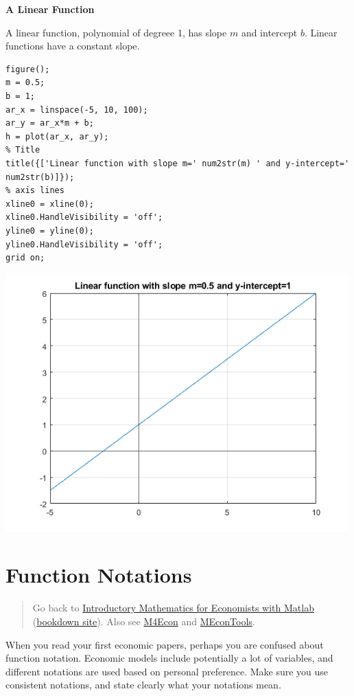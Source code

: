 \documentclass[
]{book}
\begin{document}
\textbf{A Linear Function}

A linear function, polynomial of degreee 1, has slope \(m\) and intercept
\(b\). Linear functions have a constant slope.

\begin{verbatim}
figure();
m = 0.5;
b = 1;
ar_x = linspace(-5, 10, 100);
ar_y = ar_x*m + b;
h = plot(ar_x, ar_y);
% Title
title({['Linear function with slope m=' num2str(m) ' and y-intercept=' num2str(b)]});
% axis lines
xline0 = xline(0);
xline0.HandleVisibility = 'off';
yline0 = yline(0);
yline0.HandleVisibility = 'off';
grid on;
\end{verbatim}

\includegraphics[width=5.20833in,height=\textheight]{img/whatisfunction_images/figure_2.png}

\hypertarget{function-notations}{%
\section{Function Notations}\label{function-notations}}

\begin{quote}
Go back to \href{https://math4econ.github.io/}{Introductory Mathematics for Economists with Matlab} (\href{https://math4econ.github.io/bookdown}{bookdown site}). Also see \href{http://fanwangecon.github.io/M4Econ}{M4Econ} and \href{https://fanwangecon.github.io/MEconTools/}{MEconTools}.
\end{quote}

When you read your first economic papers, perhaps you are confused about
function notation. Economic models include potentially a lot of
variables, and different notations are used based on personal
preference. Make sure you use consistent notations, and state clearly
what your notations mean.
\end{document}
